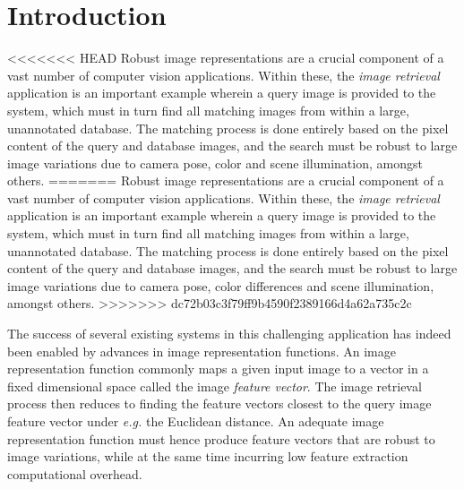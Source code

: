 \section{Introduction}

<<<<<<< HEAD
Robust image representations are a crucial component of a vast number of computer vision applications. Within these, the \emph{image retrieval} application is an important example wherein a query image is provided to the system, which must in turn find all matching images from within a large, unannotated database. The matching process is done entirely based on the pixel content of the query and database images, and the search must be robust to large image variations due to camera pose, color and scene illumination, amongst others.
=======
Robust image representations are a crucial component of a vast number of computer vision applications. Within these, the \emph{image retrieval} application is an important example wherein a query image is provided to the system, which must in turn find all matching images from within a large, unannotated database. The matching process is done entirely based on the pixel content of the query and database images, and the search must be robust to large image variations due to camera pose, color differences and scene illumination, amongst others.
>>>>>>> dc72b03c3f79ff9b4590f2389166d4a62a735c2c

The success of several existing systems in this challenging application has indeed been enabled by advances in  image representation functions. An image representation function commonly maps a given input image to a vector in a fixed dimensional space called the image \emph{feature vector}. The image retrieval process then reduces to finding the feature vectors closest to the query image feature vector under \textit{e.g.} the Euclidean distance. An adequate image representation function must hence produce feature vectors that are robust to image variations, while at the same time incurring low feature extraction computational overhead.


